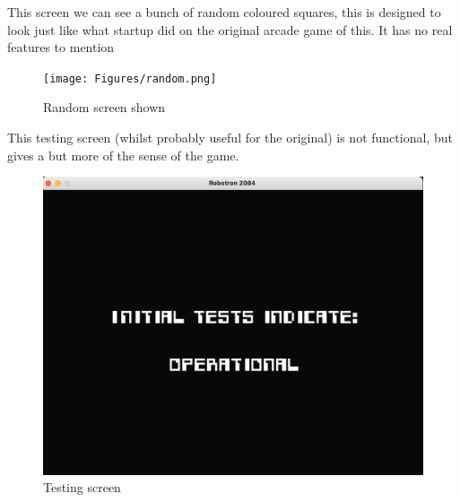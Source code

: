\newpage
This screen we can see a bunch of random coloured squares, this is designed to look just like what startup did on the original arcade game of this. It has no real features to mention
\begin{figure}[H]
  \texttt{[image: Figures/random.png]}
  \centering
  \caption{Random screen shown}
  \label{fig:HCI1}
\end{figure}
\newpage
This testing screen (whilst probably useful for the original) is not functional, but gives a but more of the sense of the game. 
\begin{figure}[H]
  \includegraphics[width=1\linewidth]{Figures/tests.png}
  \centering
  \caption{Testing screen}
  \label{fig:HCI2}
\end{figure}

